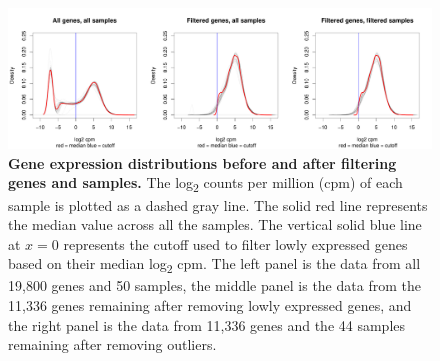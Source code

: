 \begin{figure}[!htb]
\centering
\includegraphics[width=5in]{img/ch03/gene-exp-distribution.pdf}
\caption[Gene expression distributions before and after filtering
  genes and samples.]{ \textbf{Gene expression distributions before
    and after filtering genes and samples.} The log\textsubscript{2}
  counts per million (cpm) of each sample is plotted as a dashed gray
  line. The solid red line represents the median value across all the
  samples. The vertical solid blue line at $x = 0$ represents the
  cutoff used to filter lowly expressed genes based on their median
  log\textsubscript{2} cpm. The left panel is the data from all 19,800
  genes and 50 samples, the middle panel is the data from the 11,336
  genes remaining after removing lowly expressed genes, and the right
  panel is the data from 11,336 genes and the 44 samples remaining
  after removing outliers.  }
\label{fig:gene}
\end{figure}

